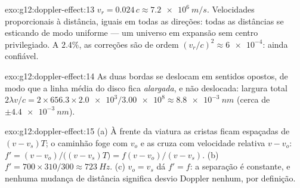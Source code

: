 \begin{solution}{exo:g12:doppler-effect:13}
$v_r = 0.024\,c \approx \qty{7.2e6}{m/s}$. Velocidades proporcionais à
distância, iguais em todas as direções: todas as distâncias se esticando
de modo uniforme --- um universo em expansão sem centro privilegiado. A
$2.4\%$, as correções são de ordem
$(v_r/c)^2 \approx \num{6e-4}$: ainda confiável.
\end{solution}

\begin{solution}{exo:g12:doppler-effect:14}
As duas bordas se deslocam em sentidos opostos, de modo que a linha média
do disco fica \emph{alargada}, e não deslocada: largura total
$2\lambda v/c = 2 \times 656.3 \times \num{2.0e3}/\num{3.00e8}
\approx \qty{8.8e-3}{nm}$ (cerca de $\pm\qty{4.4e-3}{nm}$).
\end{solution}

\begin{solution}{exo:g12:doppler-effect:15}
(a) À frente da viatura as cristas ficam espaçadas de $(v - v_s)T$; o
caminhão foge com $v_o$ e as cruza com velocidade relativa $v - v_o$:
$f' = (v - v_o)/\bigl((v - v_s)T\bigr) = f(v - v_o)/(v - v_s)$.
(b) $f' = 700 \times 310/300 \approx \qty{723}{Hz}$. (c) $v_o = v_s$ dá
$f' = f$: a separação é constante, e nenhuma mudança de distância
significa desvio Doppler nenhum, por definição.
\end{solution}

